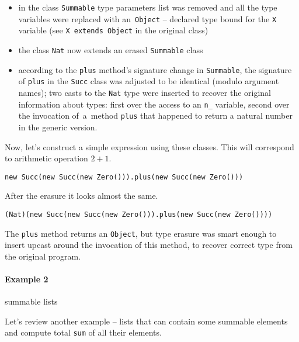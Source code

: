 \documentclass{article}[12pt]
\begin{document}
\begin{itemize}
\item in the class \texttt{Summable} type parameters list was removed
   and all the type variables were replaced with an~\texttt{Object} --
   declared type bound for the \texttt{X} variable (see
   \texttt{X extends Object} in the original class)
\item the class \texttt{Nat} now extends an erased \texttt{Summable}
  class
\item according to the \texttt{plus} method's signature change in
  \texttt{Summable}, the signature of \texttt{plus} in the \texttt{Succ}
  class was adjusted to be identical (modulo argument names);
  two casts to the \texttt{Nat} type were inserted to recover
  the original information about types: first over the access to 
  an \texttt{n\_} variable,
  second over the invocation of~a~method \texttt{plus} that
  happened to return a natural number in the generic version.
\end{itemize}
Now, let's construct a simple expression using these classes. This
will correspond to arithmetic operation $2 + 1$.

\begin{verbatim}
new Succ(new Succ(new Zero())).plus(new Succ(new Zero()))
\end{verbatim}
After the erasure it looks almost the same.
\begin{verbatim}
(Nat)(new Succ(new Succ(new Zero())).plus(new Succ(new Zero())))
\end{verbatim}

The \texttt{plus} method returns an \texttt{Object}, but
type erasure was smart enough to insert upcast around the invocation
of this method, to recover correct type from the original program.

\paragraph{Example 2} summable lists

Let's review another example -- lists that can contain some
summable elements and compute total \texttt{sum} of
all their elements.
\end{document}
